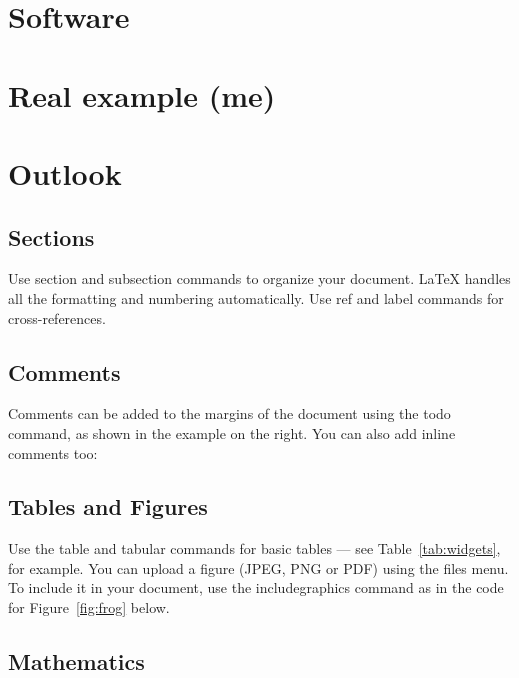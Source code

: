 \section{Software}
\label{sec:software}

\section{Real example (me)}
\label{sec:example}

\section{Outlook}
\label{sec:outlook}

\printbibliography




\subsection{Sections}

Use section and subsection commands to organize your document. \LaTeX{} handles all the formatting and numbering automatically. Use ref and label commands for cross-references.

\subsection{Comments}

Comments can be added to the margins of the document using the  todo command, as shown in the example on the right. You can also add inline comments too:


\subsection{Tables and Figures}

Use the table and tabular commands for basic tables --- see Table~\ref{tab:widgets}, for example. You can upload a figure (JPEG, PNG or PDF) using the files menu. To include it in your document, use the includegraphics command as in the code for Figure~\ref{fig:frog} below.

\subsection{Mathematics}

